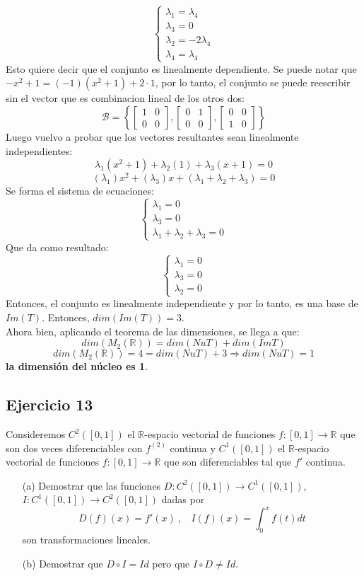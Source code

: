 \documentclass[a4paper,12pt]{article}
\begin{document}
$$
\begin{cases}
    \lambda_1=\lambda_4 \\
    \lambda_3=0 \\
    \lambda_2=-2\lambda_4 \\
    \lambda_4=\lambda_4
\end{cases}
$$
Esto quiere decir que el conjunto es linealmente dependiente. Se puede notar que $-x^2+1=(-1)(x^2+1)+2\cdot 1$, por lo tanto, el conjunto se puede reescribir sin el vector que es combinacion lineal de los otros dos:
$$
\mathcal{B}=\left \{ \begin{bmatrix} 1 & 0 \\ 0 & 0 \end{bmatrix}, \begin{bmatrix} 0 & 1 \\ 0 & 0 \end{bmatrix}, \begin{bmatrix} 0 & 0 \\ 1 & 0 \end{bmatrix} \right \}
$$
Luego vuelvo a probar que los vectores resultantes sean linealmente independientes:
$$
\lambda_1 (x^2+1) + \lambda_2 (1) + \lambda_3 (x+1) = 0
$$
$$
(\lambda_1)x^2+(\lambda_3)x+(\lambda_1+\lambda_2+\lambda_3)=0
$$
Se forma el sistema de ecuaciones:
$$
\begin{cases}
    \lambda_1=0 \\
    \lambda_3=0 \\
    \lambda_1+\lambda_2+\lambda_3=0
\end{cases}
$$
Que da como resultado:
$$
\begin{cases}
    \lambda_1=0 \\
    \lambda_3=0 \\
    \lambda_2=0
\end{cases}
$$
Entonces, el conjunto es linealmente independiente y por lo tanto, es una base de $Im(T)$. Entonces, $dim(Im(T))=3$. \\
Ahora bien, aplicando el teorema de las dimensiones, se llega a que:
$$
dim(M_2(\mathds{R}))=dim(NuT)+dim(ImT)
$$
$$
dim(M_2(\mathds{R}))=4=dim(NuT)+3 \Rightarrow dim(NuT)=1
$$
\textbf{la dimensión del núcleo es 1}.
\subsection{Ejercicio 13}
Consideremos $C^2([0,1])$ el $\mathds{R}$-espacio vectorial de funciones $f:[0,1]\to\mathds{R}$ que son dos veces diferenciables con $f^{(2)}$ continua y $C^1([0,1])$ el $\mathds{R}$-espacio vectorial de funciones $f:[0,1]\to\mathds{R}$ que son diferenciables tal que $f'$ continua.
\begin{itemize}
    \item[(a)] Demostrar que las funciones $D:C^2([0,1])\to C^1([0,1])$, $I:C^1([0,1])\to C^2([0,1])$ dadas por
    $$
    D(f)(x)=f'(x) \ , \ \ \ \ I(f)(x)=\int_0^x f(t)dt
    $$
    son transformaciones lineales.
    \item[(b)] Demostrar que $D\circ I = Id$ pero que $I\circ D \neq Id$.
\end{itemize}
\end{document}
